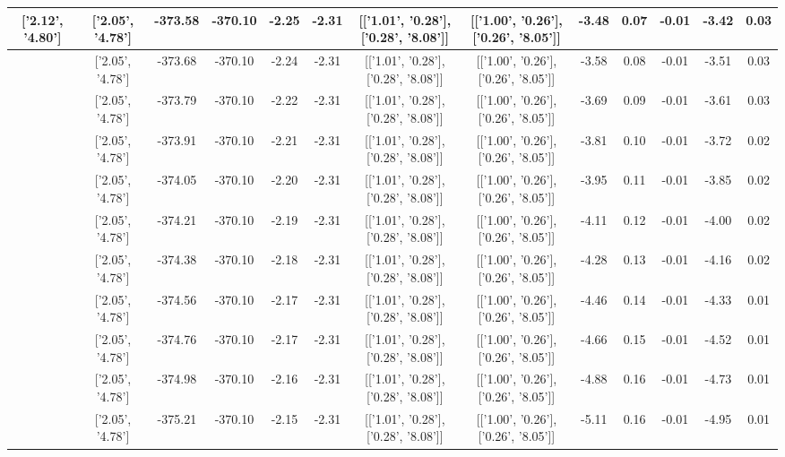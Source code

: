 \begin{table}[htbp]
\begin{adjustbox}{angle=90}
\begin{tabular}{|c|c|c|c|c|c|c|c|c|c|c|c|c|}
 ['2.12', '4.80'] & ['2.05', '4.78'] & -373.58 & -370.10 & -2.25 & -2.31 & [['1.01', '0.28'], ['0.28', '8.08']] & [['1.00', '0.26'], ['0.26', '8.05']] & -3.48 & 0.07 & -0.01 & -3.42 & 0.03\\ \hline
 ['2.13', '4.80'] & ['2.05', '4.78'] & -373.68 & -370.10 & -2.24 & -2.31 & [['1.01', '0.28'], ['0.28', '8.08']] & [['1.00', '0.26'], ['0.26', '8.05']] & -3.58 & 0.08 & -0.01 & -3.51 & 0.03\\ \hline
 ['2.14', '4.80'] & ['2.05', '4.78'] & -373.79 & -370.10 & -2.22 & -2.31 & [['1.01', '0.28'], ['0.28', '8.08']] & [['1.00', '0.26'], ['0.26', '8.05']] & -3.69 & 0.09 & -0.01 & -3.61 & 0.03\\ \hline
 ['2.15', '4.80'] & ['2.05', '4.78'] & -373.91 & -370.10 & -2.21 & -2.31 & [['1.01', '0.28'], ['0.28', '8.08']] & [['1.00', '0.26'], ['0.26', '8.05']] & -3.81 & 0.10 & -0.01 & -3.72 & 0.02\\ \hline
 ['2.17', '4.81'] & ['2.05', '4.78'] & -374.05 & -370.10 & -2.20 & -2.31 & [['1.01', '0.28'], ['0.28', '8.08']] & [['1.00', '0.26'], ['0.26', '8.05']] & -3.95 & 0.11 & -0.01 & -3.85 & 0.02\\ \hline
 ['2.18', '4.81'] & ['2.05', '4.78'] & -374.21 & -370.10 & -2.19 & -2.31 & [['1.01', '0.28'], ['0.28', '8.08']] & [['1.00', '0.26'], ['0.26', '8.05']] & -4.11 & 0.12 & -0.01 & -4.00 & 0.02\\ \hline
 ['2.19', '4.81'] & ['2.05', '4.78'] & -374.38 & -370.10 & -2.18 & -2.31 & [['1.01', '0.28'], ['0.28', '8.08']] & [['1.00', '0.26'], ['0.26', '8.05']] & -4.28 & 0.13 & -0.01 & -4.16 & 0.02\\ \hline
 ['2.20', '4.81'] & ['2.05', '4.78'] & -374.56 & -370.10 & -2.17 & -2.31 & [['1.01', '0.28'], ['0.28', '8.08']] & [['1.00', '0.26'], ['0.26', '8.05']] & -4.46 & 0.14 & -0.01 & -4.33 & 0.01\\ \hline
 ['2.21', '4.82'] & ['2.05', '4.78'] & -374.76 & -370.10 & -2.17 & -2.31 & [['1.01', '0.28'], ['0.28', '8.08']] & [['1.00', '0.26'], ['0.26', '8.05']] & -4.66 & 0.15 & -0.01 & -4.52 & 0.01\\ \hline
 ['2.22', '4.82'] & ['2.05', '4.78'] & -374.98 & -370.10 & -2.16 & -2.31 & [['1.01', '0.28'], ['0.28', '8.08']] & [['1.00', '0.26'], ['0.26', '8.05']] & -4.88 & 0.16 & -0.01 & -4.73 & 0.01\\ \hline
 ['2.24', '4.82'] & ['2.05', '4.78'] & -375.21 & -370.10 & -2.15 & -2.31 & [['1.01', '0.28'], ['0.28', '8.08']] & [['1.00', '0.26'], ['0.26', '8.05']] & -5.11 & 0.16 & -0.01 & -4.95 & 0.01\\ \hline

\end{tabular}
\end{adjustbox}
\end{table}
